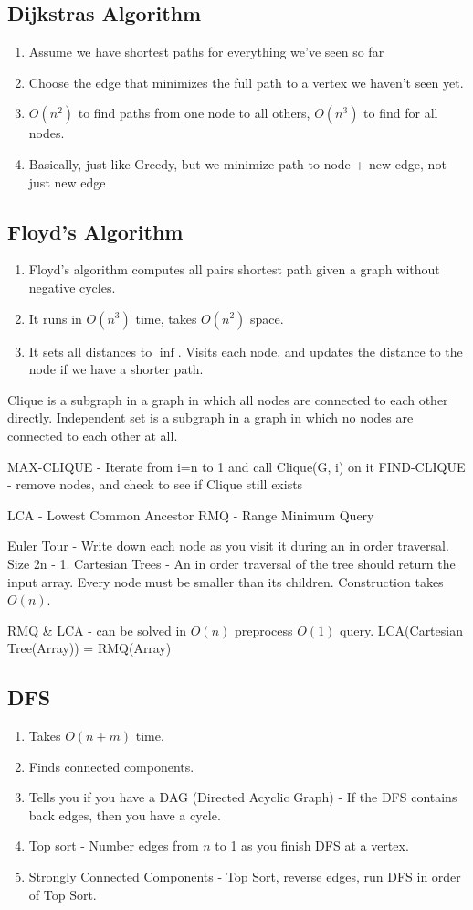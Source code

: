 \documentclass[12pt,twocolumn]{article}
\begin{document}
\subsection{Dijkstras Algorithm}
\begin{enumerate}
    \item Assume we have shortest paths for everything we've seen so far
    \item Choose the edge that minimizes the full path to a vertex we haven't seen yet.
    \item $O(n^2)$ to find paths from one node to all others, $O(n^3)$ to find for all nodes.
    \item Basically, just like Greedy, but we minimize path to node + new edge, not just new edge
\end{enumerate}

\subsection{Floyd's Algorithm}
\begin{enumerate}
    \item Floyd's algorithm computes all pairs shortest path given a graph without negative cycles.
    \item It runs in $O(n^3)$ time, takes $O(n^2)$ space.
    \item It sets all distances to $\inf$. Visits each node, and updates the distance to the node if we have a shorter path.
\end{enumerate}

Clique is a subgraph in a graph in which all nodes are connected to each other directly.
Independent set is a subgraph in a graph in which no nodes are connected to each other at all.

MAX-CLIQUE - Iterate from i=n to 1 and call Clique(G, i) on it
FIND-CLIQUE - remove nodes, and check to see if Clique still exists

LCA - Lowest Common Ancestor
RMQ - Range Minimum Query

Euler Tour - Write down each node as you visit it during an in order traversal. Size 2n - 1.
Cartesian Trees - An in order traversal of the tree should return the input array. Every node must be smaller than its children. Construction takes $O(n)$.

RMQ \& LCA - can be solved in $O(n)$ preprocess $O(1)$ query. LCA(Cartesian Tree(Array)) = RMQ(Array)

\subsection{DFS}
\begin{enumerate}
    \item Takes $O(n+m)$ time.
    \item Finds connected components.
    \item Tells you if you have a DAG (Directed Acyclic Graph) - If the DFS contains back edges, then you have a cycle.
    \item Top sort - Number edges from $n$ to 1 as you finish DFS at a vertex.
    \item Strongly Connected Components - Top Sort, reverse edges, run DFS in order of Top Sort.
\end{enumerate}
\end{document}
